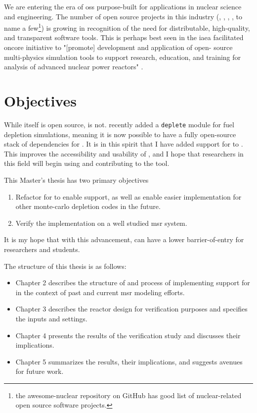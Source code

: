     We are entering the era of \Gls{oss} purpose-built for applications in nuclear science and engineering. The number of open source projects in this industry (\ONIX\cite{de_troullioud_de_lanversin_onix_2021}, \OpenMC, \NJOYTWOONE\cite{noauthor_njoy21_2022}, \Cyclus\cite{noauthor_cyclus_2022}, to name a few\footnote{the awesome-nuclear repository on GitHub \cite{romano_awesome_2022} has good list of nuclear-related open source software projects.}) is growing in recognition of the need for
    distributable, high-quality, and transparent software tools. This is perhaps best seen in the \Gls{iaea} facilitated \Gls{oncore} initiative \cite{fiorina_initiative_2021} to "[promote] development and application of open- source multi-physics simulation tools to support research, education, and training for analysis of advanced nuclear power reactors"  \cite{iaea_open-source_2022}. 


\section{Objectives}%
\label{sec:objectives}

While \SaltProc itself is open source, \SerpentTWO is not. \OpenMC recently added a \verb.deplete. module for fuel depletion simulations, meaning it is now possible to have a fully open-source stack of dependencies for \SaltProc.  It is in this spirit that I have added support for \OpenMC to \SaltProc. This improves the accessibility and usability of \SaltProc, and I hope that researchers in this field will begin using and contributing to the tool.

This Master's thesis has two primary objectives
\begin{enumerate}
    \item Refactor \SaltProc for to enable \OpenMC support, as well as enable easier implementation for other monte-carlo depletion codes in the future. 
    \item Verify the implementation on a well studied \Gls{msr} system.
\end{enumerate}

It is my hope that with this advancement, \SaltProc can have a lower barrier-of-entry for researchers and students. 

The structure of this thesis is as follows:
\begin{itemize}
    \item Chapter 2 describes the structure of \SaltProc and process of implementing support for \OpenMC in the context of past and current \Gls{msr} modeling efforts.
    \item Chapter 3 describes the reactor design for verification purposes and specifies the inputs and settings.
    \item Chapter 4 presents the results of the verification study and discusses their implications.
    \item Chapter 5 summarizes the results, their implications, and suggests avenues for future work.
\end{itemize}

